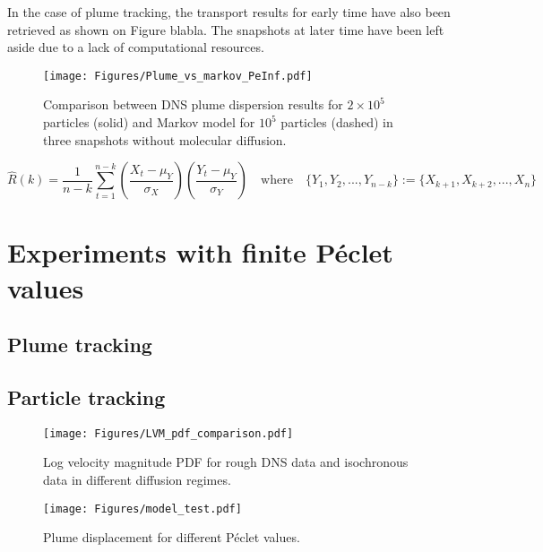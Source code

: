 In the case of plume tracking, the transport results for early time have also been retrieved as shown on Figure blabla. 
The snapshots at later time have been left aside due to a lack of computational resources. 

\begin{figure}
	\centering
	\texttt{[image: Figures/Plume\_vs\_markov\_PeInf.pdf]}
	\caption{Comparison between DNS plume dispersion results for $2\times 10^5$ particles (solid) and Markov model for $10^5$ particles (dashed) in three snapshots without molecular diffusion.}
	\label{fig:lvm_pdf_peinf}
\end{figure}

$$
\hat R(k) = \frac{1}{n-k} \sum_{t=1}^{n-k} \left(\frac{X_t-\mu_Y}{\sigma_X}\right)\left(\frac{Y_t-\mu_Y}{\sigma_Y}\right) \quad\textrm{where}\quad \{Y_1,Y_2,...,Y_{n-k}\} := \{X_{k+1},X_{k+2},...,X_{n}\} 
$$

\chapter{Experiments with finite Péclet values}

\section{Plume tracking}

\section{Particle tracking}


\begin{figure}
	\centering
	\texttt{[image: Figures/LVM\_pdf\_comparison.pdf]}
	\caption{Log velocity magnitude PDF for rough DNS data and isochronous data in different diffusion regimes.}
	\label{fig:lvm_pdf_peinf}
\end{figure}

\begin{figure}
	\centering
	\texttt{[image: Figures/model\_test.pdf]}
	\caption{Plume displacement for different Péclet values.}
	\label{fig:lvm_pdf_peinf}
\end{figure}